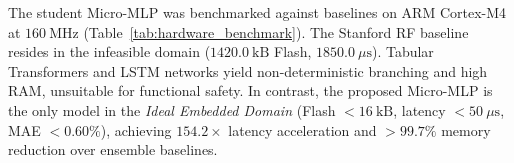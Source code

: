 \begin{table}[!t]
	\caption{Hardware Benchmark on ARM Cortex-M4 @ 160~MHz}
	\label{tab:hardware_benchmark}
	\centering
\end{table}

The student Micro-MLP was benchmarked against baselines on ARM Cortex-M4 at $160\ \text{MHz}$ (Table~\ref{tab:hardware_benchmark}). The Stanford RF baseline \cite{che2025enhanced} resides in the infeasible domain ($1420.0\ \text{kB}$ Flash, $1850.0\ \mu\text{s}$). Tabular Transformers and LSTM networks yield non-deterministic branching and high RAM, unsuitable for functional safety. In contrast, the proposed Micro-MLP is the only model in the \textit{Ideal Embedded Domain} (Flash $< 16\ \text{kB}$, latency $< 50\ \mu\text{s}$, MAE $< 0.60\%$), achieving $154.2\times$ latency acceleration and $>99.7\%$ memory reduction over ensemble baselines.

